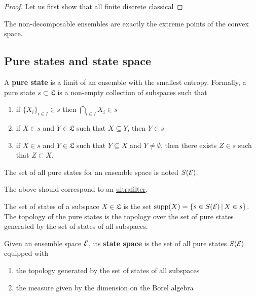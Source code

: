 \begin{proof}
	Let us first show that all finite discrete classical 
\end{proof}

\begin{remark}
	The non-decomposable ensembles are exactly the extreme points of the convex space.
\end{remark}



\subsection{Pure states and state space}

\begin{defn}
	A \textbf{pure state} is a limit of an ensemble with the smallest entropy. Formally, a pure state $s \subset \mathfrak{L}$ is a non-empty collection of subspaces such that
	\begin{enumerate}
		\item if $\{X_i\}_{i \in I} \in s$ then $\bigcap_{i \in I} X_i \in s$
		\item if $X \in s$ and $Y \in \mathfrak{L}$ such that $X \subseteq Y$, then $Y \in s$
		\item if $X \in s$ and $Y \in \mathfrak{L}$ such that $Y \subseteq X$ and $Y \neq \emptyset$, then there exists $Z \in s$ such that $Z \subset X$.
	\end{enumerate}
	The set of all pure states for an ensemble space is noted $S(\mathcal{E})$.
\end{defn}

\begin{remark}
	The above should correspond to an \href{https://en.wikipedia.org/wiki/Ultrafilter}{ultrafilter}.
\end{remark}

\begin{defn}
	The set of states of a subspace $X \in \mathfrak{L}$ is the set $\mathrm{supp}(X) = \{ s \in S(\mathcal{E}) \, | \, X \in s \}$. The topology of the pure states is the topology over the set of pure states generated by the set of states of all subspaces.
\end{defn}

\begin{defn}
	Given an ensemble space $\mathcal{E}$, its \textbf{state space} is the set of all pure states $S(\mathcal{E})$ equipped with
	\begin{enumerate}
		\item the topology generated by the set of states of all subspaces
		\item the measure given by the dimension on the Borel algebra
	\end{enumerate}
\end{defn}

